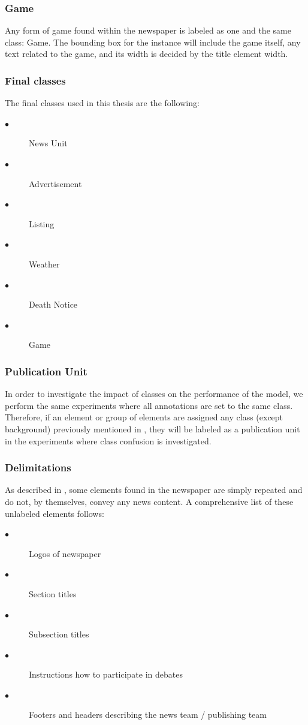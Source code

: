 \documentclass[oneside, english, bibtex]{kththesis}
\begin{document}
\subsubsection{Game}

Any form of game found within the newspaper is labeled as one and the same class: Game.
The bounding box for the instance will include the game itself, any text related to the game, and its width is decided by the title element width.

\subsubsection{Final classes}
\label{subs:finalclasses}
The final classes used in this thesis are the following:

\begin{description}
\item[$\bullet$] News Unit
\item[$\bullet$] Advertisement
\item[$\bullet$] Listing
\item[$\bullet$] Weather
\item[$\bullet$] Death Notice
\item[$\bullet$] Game
\end{description}

\subsubsection{Publication Unit}
\label{subs:pubunit}

In order to investigate the impact of classes on the performance of the model, we perform the same experiments where all annotations are set to the same class.
Therefore, if an element or group of elements are assigned any class (except background) previously mentioned in , they will be labeled as a publication unit in the experiments where class confusion is investigated.

\subsubsection{Delimitations}

As described in , some elements found in the newspaper are simply repeated and do not, by themselves, convey any news content.
A comprehensive list of these unlabeled elements follows:

\begin{description}
\item[$\bullet$] Logos of newspaper
\item[$\bullet$] Section titles
\item[$\bullet$] Subsection titles
\item[$\bullet$] Instructions how to participate in debates
\item[$\bullet$] Footers and headers describing the news team / publishing team
\end{description}
\end{document}
